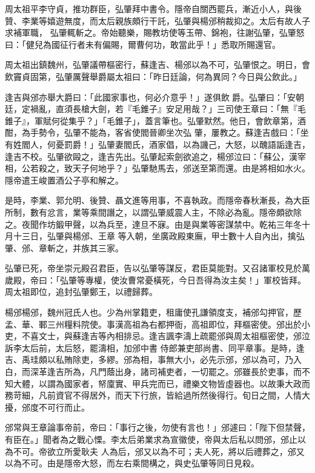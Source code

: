 \begin{pinyinscope}
 周太祖平李守貞，推功群臣，弘肇拜中書令。隱帝自關西罷兵，漸近小人，與後贊、李業等嬉遊無度，而太后親族頗行干託，弘肇與楊邠稍裁抑之。太后有故人子求補軍職，
 弘肇輒斬之。帝始聽樂，賜教坊使等玉帶、錦袍，往謝弘肇，弘肇怒曰：「健兒為國征行者未有偏賜，爾曹何功，敢當此乎！」悉取所賜還官。



 周太祖出鎮魏州，弘肇議帶樞密行，蘇逢吉、楊邠以為不可，弘肇恨之。明日，會飲竇貞固第，弘肇厲聲舉爵屬太祖曰：「昨日廷論，何為異同？今日與公飲此。」



 逢吉與邠亦舉大爵曰：「此國家事也，何必介意乎！」遂俱飲爵。弘肇曰：「安朝廷，定禍亂，直須長槍大劍，若『毛錐子』安足用哉？」三司使王章曰：「無『毛錐子』，軍賦何從集乎？」「毛錐子」，蓋言筆也。弘肇默然。他日，會飲章第，酒酣，為手勢令，弘肇不能為，客省使閻晉卿坐次弘
 肇，屢教之。蘇逢吉戲曰：「坐有姓閻人，何憂罰爵！」弘肇妻閻氏，酒家倡，以為譏己，大怒，以醜語詬逢吉，逢吉不校。弘肇欲毆之，逢吉先出。弘肇起索劍欲追之，楊邠泣曰：「蘇公，漢宰相，公若殺之，致天子何地乎？」弘肇馳馬去，邠送至第而還。由是將相如水火。隱帝遣王峻置酒公子亭和解之。



 是時，李業、郭允明、後贊、聶文進等用事，不喜執政。而隱帝春秋漸長，為大臣所制，數有忿言，業等乘間譖之，以謂弘肇威震人主，不除必為亂。隱帝頗欲除之。夜聞作坊鍛甲聲，以為兵至，達旦不寐。由是與業等密謀禁中。乾祐三年冬十月十三日，弘肇與楊邠、王章
 等入朝，坐廣政殿東廡，甲士數十人自內出，擒弘肇、邠、章斬之，并族其三家。



 弘肇已死，帝坐崇元殿召君臣，告以弘肇等謀反，君臣莫能對。又召諸軍校見於萬歲殿，帝曰：「弘肇等專權，使汝曹常憂橫死，今日吾得為汝主矣！」軍校皆拜。周太祖即位，追封弘肇鄭王，以禮歸葬。



 楊邠楊邠，魏州冠氏人也。少為州掌籍吏，租庸使孔謙領度支，補邠勾押官，歷孟、華、鄆三州糧料院使。事漢高祖為右都押衙，高祖即位，拜樞密使。邠出於小吏，不喜文士，與蘇逢吉等內相排忌。逢吉諷李濤上疏罷邠與周太祖樞密使，邠泣訴李太后前，太后怒，罷濤相，加邠中書
 侍郎兼吏部尚書、同平章事。是時，逢吉、禹珪頗以私賄除吏，多繆。邠為相，事無大小，必先示邠，邠以為可，乃入白，而深革逢吉所為，凡門蔭出身，諸司補吏者，一切罷之。邠雖長於吏事，而不知大體，以謂為國家者，帑廩實、甲兵完而已，禮樂文物皆虛器也。以故秉大政而務苛細，凡前資官不得居外，而天下行旅，皆給過所然後得行。旬日之間，人情大擾，邠度不可行而止。



 邠常與王章論事帝前，帝曰：「事行之後，勿使有言也！」邠遽曰：「陛下但禁聲，有臣在。」聞者為之戰心慄。李太后弟業求為宣徽使，帝與太后私以問邠，邠止以為不可。帝欲立所愛耿夫
 人為后，邠又以為不可；夫人死，將以后禮葬之，邠又以為不可。由是隱帝大怒，而左右乘間構之，與史弘肇等同日見殺。




\end{pinyinscope}

